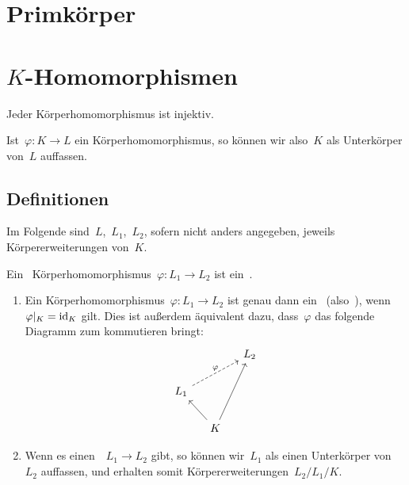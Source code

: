 \clearpage





\section{Primkörper}






\section{\texorpdfstring{$K$}{K}-Homomorphismen}

\begin{proposition}
  Jeder Körperhomomorphismus ist injektiv.
\end{proposition}

\begin{remark}
  Ist~$\varphi \colon K \to L$ ein Körperhomomorphismus, so können wir also~$K$ als Unterkörper von~$L$ auffassen.
\end{remark}



\subsection{Definitionen}

\begin{convention}
  Im Folgende sind~$L$,~$L_1$,~$L_2$, sofern nicht anders angegeben, jeweils Körpererweiterungen von~$K$.
\end{convention}

\begin{definition}
  Ein~ Körperhomomorphismus~$\varphi \colon L_1 \to L_2$ ist ein~.
\end{definition}

\begin{remark}
  \leavevmode
  \begin{enumerate}
    \item
      Ein Körperhomomorphismus~$\varphi \colon L_1 \to L_2$ ist genau dann ein~ (also~), wenn~$\restrict{\varphi}{K} = \id_K$ gilt.
      Dies ist außerdem äquivalent dazu, dass~$\varphi$ das folgende Diagramm zum kommutieren bringt:
      \[
        \begin{tikzcd}[column sep = small]
          {}
          &
          {}
          &
          L_2
          \\
          L_1
          \arrow[dashed]{urr}[above]{\varphi}
          &
          {}
          &
          {}
          \\
          {}
          &
          K
          \arrow{ul}
          \arrow{uur}
          &
          {}
        \end{tikzcd}
      \]
    \item
      Wenn es einen~~$L_1 \to L_2$ gibt, so können wir~$L_1$ als einen Unterkörper von~$L_2$ auffassen, und erhalten somit Körpererweiterungen~$L_2/L_1/K$.
  \end{enumerate}
\end{remark}

